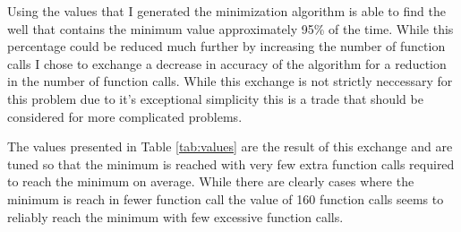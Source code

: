 \documentclass{article}
\begin{document}
Using the values that I generated the minimization algorithm is able to find the well that contains the minimum value approximately 95\% of the time. While this percentage could be reduced much further by increasing the number of function calls I chose to exchange a decrease in accuracy of the algorithm for a reduction in the number of function calls.  While this exchange is not strictly neccessary for this problem due to it's exceptional simplicity this is a trade that should be considered for more complicated problems.

The values presented in Table \ref{tab:values} are the result of this exchange and are tuned so that the minimum is reached with very few extra function calls required to reach the minimum on average.  While there are clearly cases where the minimum is reach in fewer function call the value of 160 function calls seems to reliably reach the minimum with few excessive function calls.
\end{document}
